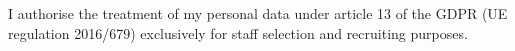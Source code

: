 \documentclass[a3paper,british]{twentysecondcv} %
\begin{document}
\vspace*{\fill}
I authorise the treatment of my personal data under article 13 of the GDPR (UE regulation 2016/679) exclusively for staff selection and recruiting purposes.










\end{document}
